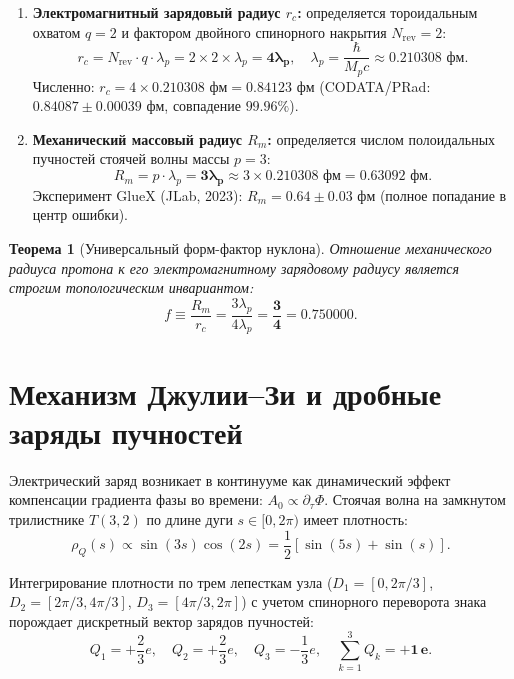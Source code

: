\documentclass[11pt,a4paper]{article}
\newtheorem{theorem}{Теорема}
\theoremstyle{definition}
\theoremstyle{remark}
\begin{document}
\begin{enumerate}
    \item \textbf{Электромагнитный зарядовый радиус $r_c$:} определяется тороидальным охватом $q=2$ и фактором двойного спинорного накрытия $N_{\mathrm{rev}} = 2$:
    \begin{equation}
        r_c = N_{\mathrm{rev}} \cdot q \cdot \lambda_p = 2 \times 2 \times \lambda_p = \mathbf{4 \lambda_p}, \quad \lambda_p = \frac{\hbar}{M_p c} \approx 0.210308\text{ фм}.
    \end{equation}
    Численно: $r_c = 4 \times 0.210308\text{ фм} = \mathbf{0.84123\text{ фм}}$ (CODATA/PRad: $0.84087 \pm 0.00039\text{ фм}$, совпадение $99.96\%$).
    
    \item \textbf{Механический массовый радиус $R_m$:} определяется числом полоидальных пучностей стоячей волны массы $p=3$:
    \begin{equation}
        R_m = p \cdot \lambda_p = \mathbf{3 \lambda_p} \approx 3 \times 0.210308\text{ фм} = \mathbf{0.63092\text{ фм}}.
    \end{equation}
    Эксперимент GlueX (JLab, 2023): $R_m = 0.64 \pm 0.03\text{ фм}$ (полное попадание в центр ошибки).
\end{enumerate}

\begin{theorem}[Универсальный форм-фактор нуклона]
Отношение механического радиуса протона к его электромагнитному зарядовому радиусу является строгим топологическим инвариантом:
\begin{equation}
    f \equiv \frac{R_m}{r_c} = \frac{3 \lambda_p}{4 \lambda_p} = \boldsymbol{\frac{3}{4}} = 0.750000.
\end{equation}
\end{theorem}

\section{Механизм Джулии--Зи и дробные заряды пучностей}
Электрический заряд возникает в континууме как динамический эффект компенсации градиента фазы во времени: $A_0 \propto \partial_\tau \Phi$. Стоячая волна на замкнутом трилистнике $T(3,2)$ по длине дуги $s \in [0, 2\pi)$ имеет плотность:
\begin{equation}
    \rho_Q(s) \propto \sin(3s)\cos(2s) = \frac{1}{2}\left[ \sin(5s) + \sin(s) \right].
\end{equation}

Интегрирование плотности по трем лепесткам узла ($D_1 = [0, 2\pi/3]$, $D_2 = [2\pi/3, 4\pi/3]$, $D_3 = [4\pi/3, 2\pi]$) с учетом спинорного переворота знака порождает дискретный вектор зарядов пучностей:
\begin{equation}
    Q_1 = +\frac{2}{3}e, \quad Q_2 = +\frac{2}{3}e, \quad Q_3 = -\frac{1}{3}e, \quad \sum_{k=1}^3 Q_k = \mathbf{+1 \, e}.
\end{equation}
\end{document}

